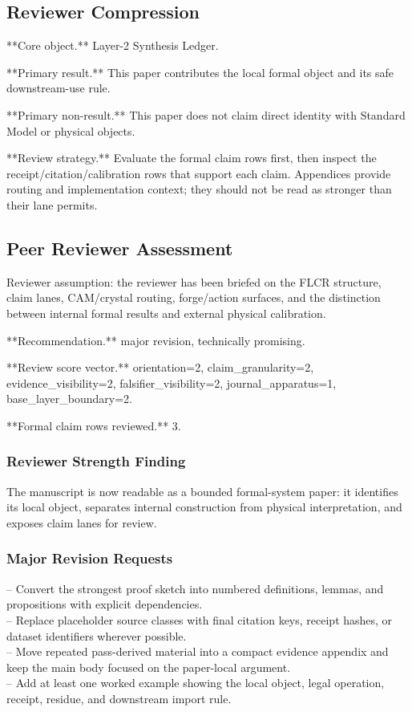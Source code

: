 \documentclass[11pt]{article}
\begin{document}
\subsection*{Reviewer Compression}

**Core object.** Layer-2 Synthesis Ledger.

**Primary result.** This paper contributes the local formal object and its safe downstream-use rule.

**Primary non-result.** This paper does not claim direct identity with Standard Model or physical objects.

**Review strategy.** Evaluate the formal claim rows first, then inspect the receipt/citation/calibration rows that support each claim. Appendices provide routing and implementation context; they should not be read as stronger than their lane permits.

\subsection*{Peer Reviewer Assessment}

Reviewer assumption: the reviewer has been briefed on the FLCR structure, claim lanes, CAM/crystal routing, forge/action surfaces, and the distinction between internal formal results and external physical calibration.

**Recommendation.** major revision, technically promising.

**Review score vector.** orientation=2, claim\_granularity=2, evidence\_visibility=2, falsifier\_visibility=2, journal\_apparatus=1, base\_layer\_boundary=2.

**Formal claim rows reviewed.** 3.

\subsubsection*{Reviewer Strength Finding}

The manuscript is now readable as a bounded formal-system paper: it identifies its local object, separates internal construction from physical interpretation, and exposes claim lanes for review.

\subsubsection*{Major Revision Requests}

\noindent{}-- Convert the strongest proof sketch into numbered definitions, lemmas, and propositions with explicit dependencies.\\
\noindent{}-- Replace placeholder source classes with final citation keys, receipt hashes, or dataset identifiers wherever possible.\\
\noindent{}-- Move repeated pass-derived material into a compact evidence appendix and keep the main body focused on the paper-local argument.\\
\noindent{}-- Add at least one worked example showing the local object, legal operation, receipt, residue, and downstream import rule.\\
\end{document}
